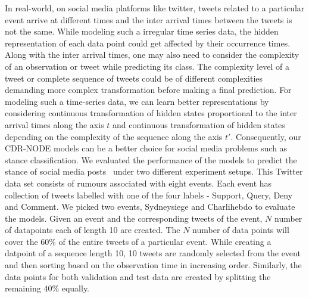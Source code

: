 \documentclass{article} %
\newcommand{\bx}{\mathbf{x}}
\begin{document}
 In real-world, on social media platforms like twitter, tweets related to a particular event arrive at different times and the inter arrival times between the tweets is not the same. While modeling such a irregular time series data, the hidden representation of each data point could  get affected by their occurrence times. Along with the inter arrival times, one may also need to consider the complexity of an observation or tweet while predicting its class. The complexity level of a tweet or complete sequence of tweets could be of different complexities demanding more complex transformation before making a final prediction. For modeling such a time-series data,  we can learn better representations by considering   continuous transformation of hidden states proportional to the inter arrival times along the axis $t$ and continuous transformation of hidden states depending on the complexity of the sequence along the axis $t'$.  Consequently, our  CDR-NODE models can be a better choice for social media problems such as stance classification.  We evaluated the performance of the models to predict the stance of social media posts~\cite{RumourEval_2019_dataset} under two different experiment setups. This Twitter data set consists of rumours associated with eight events. Each event has collection of tweets labelled with one of the four labels - Support, Query, Deny and Comment. We picked two events, Sydneysiege and Charlihebdo to evaluate the models. Given an event and the corresponding tweets of the event, $N$ number of datapoints each of length 10 are created. The $N$ number of data points will cover the 60\% of the entire tweets of a particular event. While creating a datpoint of a sequence length 10, 10 tweets are randomly selected from the event and then sorting based on the observation time in increasing order. Similarly, the data points for both validation and test data are created by splitting the remaining 40\% equally. %
\end{document}
